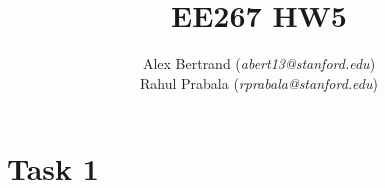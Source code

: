 \documentclass[12pt, letterpaper]{article}
\begin{document}
\title{EE267 HW5}
\author{Alex Bertrand (\emph{abert13@stanford.edu}) \\
        Rahul Prabala (\emph{rprabala@stanford.edu})}
\maketitle
\def\tr{\text{tr}}
\newcommand{\tn}[1]{#1^{(i)}}
\newcommand{\tnj}[1]{#1^{(j)}}
\newcommand{\del}[1]{\frac{\partial}{\partial #1}}
\newcommand{\delf}[2]{\frac{\partial #1}{\partial #2}}
\newcommand{\vc}[1]{\text{VC}(#1)}
\newcommand{\norm}[1]{\|#1\|}
\newcommand{\ltwo}[1]{\|#1\|_2}
\newcommand{\rekt}{\makebox[0pt][l]{$\square$}\raisebox{.15ex}{\hspace{0.1em}$\checkmark$} \text{rekt}}
\allowdisplaybreaks


\section*{Task 1}
\end{document}
